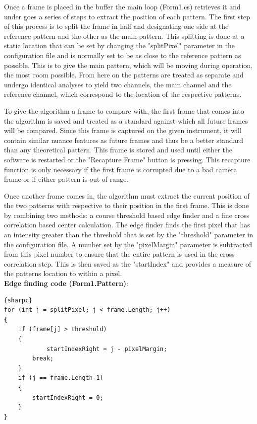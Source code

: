 \documentclass{article}
\begin{document}
Once a frame is placed in the buffer the main loop (Form1.cs) retrieves it and under goes a series of steps to extract the position of each pattern. The first step of this process is to split the frame in half and designating one side at the reference pattern and the other as the main pattern. This splitting is done at a static location that can be set by changing the "splitPixel" parameter in the configuration file and is normally set to be as close to the reference pattern as possible. This is to give the main pattern, which will be moving during operation, the most room possible. From here on the patterns are treated as separate and undergo identical analyses to yield two channels, the main channel and the reference channel, which correspond to the location of the respective patterns.

To give the algorithm a frame to compare with, the first frame that comes into the algorithm is saved and treated as a standard against which all future frames will be compared. Since this frame is captured on the given instrument, it will contain similar nuance features as future frames and thus be  a better standard than any theoretical pattern. This frame is stored and used until either the software is restarted or the "Recapture Frame" button is pressing. This recapture function is only necessary if the first frame is corrupted due to a bad camera frame or if either pattern is out of range.

Once another frame comes in, the algorithm must extract the current position of the two patterns with respective to their position in the first frame. This is done by combining two methods: a course threshold based edge finder and a fine cross correlation based center calculation. The edge finder finds the first pixel that has an intensity greater than the threshold that is set by the "threshold" parameter in the configuration file. A number set by the "pixelMargin" parameter is subtracted from this pixel number to ensure that the entire pattern is used in the cross correlation step. This is then saved as the "startIndex" and provides a measure of the patterns location to within a pixel. \\

\textbf{Edge finding code (Form1.Pattern)}:
\begin{lstlisting}{sharpc}                    
for (int j = splitPixel; j < frame.Length; j++)
{
	if (frame[j] > threshold)
	{
    		startIndexRight = j - pixelMargin;
		break;
	}
	if (j == frame.Length-1)
	{
		startIndexRight = 0;
	}
}
\end{lstlisting}
\end{document}
